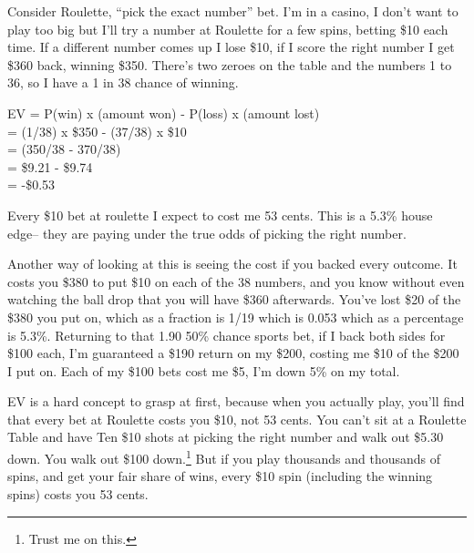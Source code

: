 Consider Roulette, ``pick the exact number'' bet. I'm in a casino,
I don't want to play too big but I'll try a number at Roulette for a few
spins, betting \$10 each time. If a different number comes up I lose \$10,
if I score the right number I get \$360 back, winning \$350. There's two
zeroes on the table and the numbers 1 to 36, so I have a 1 in 38 chance of
winning.

EV = P(win) x (amount won) - P(loss) x (amount lost) \\
   = (1/38) x \$350 - (37/38) x \$10 \\
   = (350/38 - 370/38)  \\
   = \$9.21 - \$9.74 \\
   = -\$0.53

Every \$10 bet at roulette I expect to cost me 53 cents. This is a 5.3\% house
edge-- they are paying under the true odds of picking the right
number.

Another way of looking at this is seeing the cost if you backed every
outcome. It costs you \$380 to put \$10 on each of the 38 numbers, and
you know without even watching the ball drop that you will have \$360
afterwards. You've lost \$20 of the \$380 you put on, which as a
fraction is 1/19 which is 0.053 which as a percentage is 5.3\%.
Returning to that 1.90 50\% chance sports bet, if I back both sides for
\$100 each, I'm guaranteed a \$190 return on my \$200, costing me \$10
of the \$200 I put on. Each of my \$100 bets cost me \$5, I'm down 5\%
on my total.


EV is a hard concept to grasp at first, because when you actually
play, you'll find that every bet at Roulette costs you \$10, not
53 cents. You can't sit at a Roulette Table and
have Ten \$10 shots at picking the right number and walk out \$5.30
down. You walk out \$100 down.\footnote{Trust me on this.} But if you
play thousands and thousands of spins, and get your fair share of
wins, every \$10 spin (including the winning spins) costs you 53
cents.



